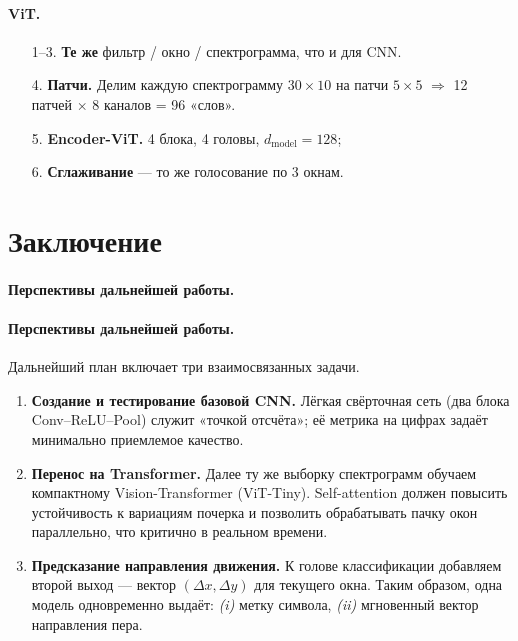 \documentclass[12pt,a4paper]{article}
\begin{document}
\paragraph{ViT.}
\begin{enumerate}
  \item[1–3.] \textbf{Те же} фильтр / окно / спектрограмма, что и для CNN.
  \item[4.] \textbf{Патчи.}  Делим каждую спектрограмму $30{\times}10$  
        на патчи $5{\times}5$  $\Rightarrow$  12 патчей $\times$ 8 каналов = 96 «слов».
  \item[5.] \textbf{Encoder-ViT.} 4 блока, 4 головы, $d_{\text{model}}{=}128$;  
  \item[6.] \textbf{Сглаживание} — то же голосование по 3 окнам.
\end{enumerate}


\section*{Заключение}
\paragraph{Перспективы дальнейшей работы.}
\paragraph{Перспективы дальнейшей работы.}
Дальнейший план включает три взаимосвязанных задачи.

\begin{enumerate}
  \item \textbf{Создание и тестирование базовой CNN.}  
        Лёгкая свёрточная сеть (два блока Conv–ReLU–Pool) служит «точкой отсчёта»; её метрика на цифрах задаёт минимально приемлемое качество.

  \item \textbf{Перенос на Transformer.}  
        Далее ту же выборку спектрограмм обучаем компактному Vision-Transformer (ViT-Tiny). Self-attention должен повысить устойчивость к вариациям почерка и позволить обрабатывать пачку окон параллельно, что критично в реальном времени.

  \item \textbf{Предсказание направления движения.}  
        К голове классификации добавляем второй выход — вектор \((\Delta x, \Delta y)\) для текущего окна. Таким образом, одна модель одновременно выдаёт:  
        \emph{(i)} метку символа, \emph{(ii)} мгновенный вектор направления пера.
\end{enumerate}
\end{document}
